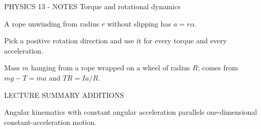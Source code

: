 PHYSICS 13 - NOTES
Torque and rotational dynamics

A rope unwinding from radius \(r\) without slipping has \(a = r\alpha\).

Pick a positive rotation direction and use it for every torque and every acceleration.

Mass \(m\) hanging from a rope wrapped on a wheel of radius \(R\); comes from \(mg - T = ma\) and \(TR = Ia/R\).

LECTURE SUMMARY ADDITIONS

Angular kinematics with constant angular acceleration parallels one-dimensional constant-acceleration motion.
